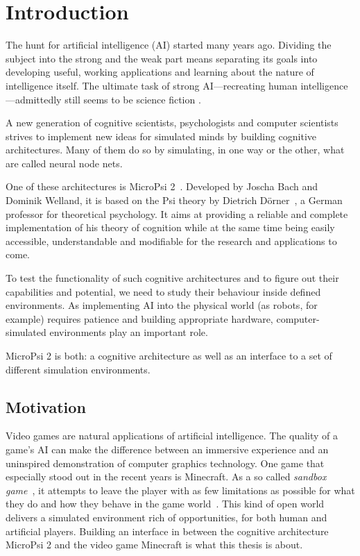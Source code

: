 \chapter{Introduction}
\label{chap:1}


The hunt for artificial intelligence (AI) started many years ago. Dividing the subject into the strong and the weak part means separating its goals into developing useful, working applications and learning about the nature of intelligence itself. The ultimate task of strong AI---recreating human intelligence---admittedly still seems to be science fiction    .


A new generation of cognitive scientists, psychologists and computer scientists strives to implement new ideas for simulated minds by building cognitive architectures. Many of them do so by simulating, in one way or the other, what are called neural node nets.

One of these architectures is MicroPsi 2~\cite{conf/agi/Bach12}. Developed by Joscha Bach and Dominik Welland, it is based on the Psi theory by Dietrich Dörner~\cite{Doerner98}, a German professor for theoretical psychology. It aims at providing a reliable and complete implementation of his theory of cognition while at the same time being easily accessible, understandable and modifiable for the research and applications to come.

To test the functionality of such cognitive architectures and to figure out their capabilities and potential, we need to study their behaviour inside defined environments. As implementing AI into the physical world (as robots, for example) requires patience and building appropriate hardware, computer-simulated environments play an important role.

MicroPsi 2 is both: a cognitive architecture as well as an interface to a set of different simulation environments.

\section{Motivation}

Video games are natural applications of artificial intelligence. The quality of a game's AI can make the difference between an immersive experience and an uninspired demonstration of computer graphics technology. One game that especially stood out in the recent years is Minecraft. As a so called \emph{sandbox game}~\cite{Duncan:2011:MBC:2207096.2207097}, it attempts to leave the player with as few limitations as possible for what they do and how they behave in the game world~\cite{doi:10.1162/dmal.9780262693646.167}. This kind of open world delivers a simulated environment rich of opportunities, for both human and artificial players. Building an interface in between the cognitive architecture MicroPsi 2 and the video game Minecraft is what this thesis is about.

